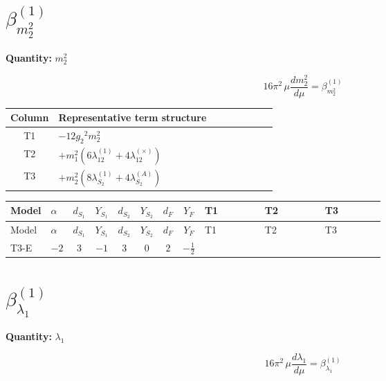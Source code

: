 \documentclass[8pt]{article}
\begin{document}
\begin{landscape}
\section*{$\beta_{m_2^2}^{(1)}$}
\noindent\textbf{Quantity: }$m_2^2$\par\smallskip
\[16\pi^2\,\mu\frac{d m_2^2}{d\mu}=\beta_{m_2^2}^{(1)}\]
\begin{center}
\begin{tabular}{@{}c >{\raggedright\arraybackslash}p{0.82\linewidth}@{}}
\toprule
Column & Representative term structure \\
\midrule
T1 & \(\displaystyle -12 {g_2}^2 {m_2^2}\) \\
\midrule
T2 & \(\displaystyle +{m_1^2} (6 {\lambda_{12}^{(1)}}+4 {\lambda_{12}^{(\times)}})\) \\
\midrule
T3 & \(\displaystyle +{m_2^2} (8 {\lambda_{S_2}^{(1)}}+4 {\lambda_{S_2}^{(A)}})\) \\
\midrule
\bottomrule
\end{tabular}
\end{center}
\smallskip
\tiny
\begin{longtable}{@{}llcccccc >{\raggedright\arraybackslash}p{0.21\linewidth} >{\raggedright\arraybackslash}p{0.21\linewidth} >{\raggedright\arraybackslash}p{0.21\linewidth}@{}}
\toprule
Model & $\alpha$ & $d_{S_1}$ & $Y_{S_1}$ & $d_{S_2}$ & $Y_{S_2}$ & $d_F$ & $Y_F$ & T1 & T2 & T3 \\
\midrule
\endfirsthead
\toprule
Model & $\alpha$ & $d_{S_1}$ & $Y_{S_1}$ & $d_{S_2}$ & $Y_{S_2}$ & $d_F$ & $Y_F$ & T1 & T2 & T3 \\
\midrule
\endhead
T3-E & $-2$ & $3$ & $-1$ & $3$ & $0$ & $2$ & $-\frac{1}{2}$ & \scriptsize\adjustbox{max width=\linewidth}{$\begin{gathered} -12 {g_2}^2 {m_2^2}\end{gathered}$} & \scriptsize\adjustbox{max width=\linewidth}{$\begin{gathered} +{m_1^2} (6 {\lambda_{12}^{(1)}}+4 {\lambda_{12}^{(\times)}})\end{gathered}$} & \scriptsize\adjustbox{max width=\linewidth}{$\begin{gathered} +{m_2^2} (8 {\lambda_{S_2}^{(1)}}+4 {\lambda_{S_2}^{(A)}})\end{gathered}$} \\
\midrule
\bottomrule
\end{longtable}
\clearpage
\section*{$\beta_{\lambda_1}^{(1)}$}
\noindent\textbf{Quantity: }$\lambda_1$\par\smallskip
\[16\pi^2\,\mu\frac{d \lambda_1}{d\mu}=\beta_{\lambda_1}^{(1)}\]

\end{landscape}
\end{document}

